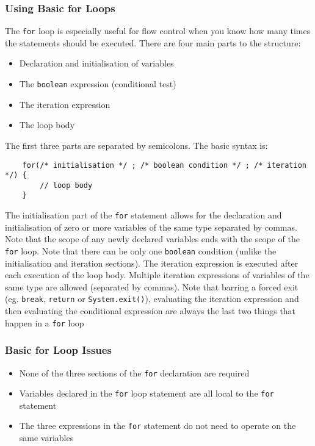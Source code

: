 \subsubsection{Using Basic for Loops}
The \verb#for# loop is especially useful for flow control when you know how 
many times the statements should be executed. There are four main parts to the 
structure:
\begin{itemize}
    \item Declaration and initialisation of variables
    \item The \verb#boolean# expression (conditional test)
    \item The iteration expression
    \item The loop body
\end{itemize}
The first three parts are separated by semicolons. The basic syntax is:
\begin{verbatim}
    for(/* initialisation */ ; /* boolean condition */ ; /* iteration */) {
        // loop body
    }
\end{verbatim}
The initialisation part of the \verb#for# statement allows for the declaration 
and initialisation of zero or more variables of the same type separated by 
commas. Note that the scope of any newly declared variables ends with the scope 
of the \verb#for# loop. Note that there can be only one \verb#boolean# 
condition (unlike the initialisation and iteration sections). The iteration 
expression is executed after each execution of the loop body. Multiple 
iteration expressions of variables of the same type are allowed (separated by 
commas). Note that barring a forced exit (eg. \verb#break#, \verb#return# or 
\verb#System.exit()#), evaluating the iteration expression and then evaluating 
the conditional expression are always the last two things that happen in a 
\verb#for# loop

\subsubsection{Basic for Loop Issues}
\begin{itemize}
    \item None of the three sections of the \verb#for# declaration are required
    \item Variables declared in the \verb#for# loop statement are all local to 
    the \verb#for# statement
    \item The three expressions in the \verb#for# statement do not need to 
    operate on the same variables
\end{itemize}

